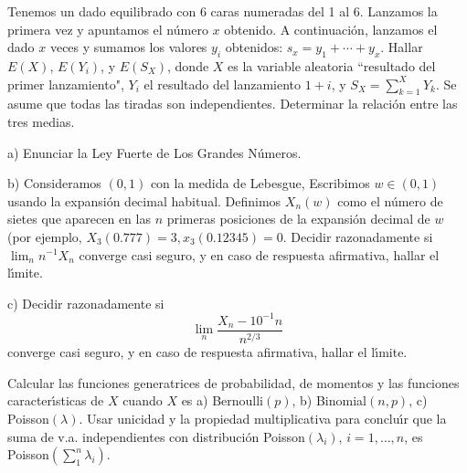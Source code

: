 \begin{problem}[2] Tenemos un dado equilibrado con 6 caras numeradas del 1 al 6. Lanzamos la  primera vez y 
apuntamos el n\'umero $x$ obtenido. A continuaci\'on, 
lanzamos el dado $x$ veces y sumamos los valores $y_i$ obtenidos: $s_x = y_1 + \cdots  + y_x$.
Hallar $E(X)$, $E(Y_i)$, y $E(S_X)$, donde $X$ es la variable aleatoria ``resultado del primer lanzamiento", $Y_i$ el resultado del lanzamiento
$ 1 + i$, y $S_X = \sum_{k = 1}^X Y_k$. Se asume que todas
las tiradas son independientes. 
Determinar la relaci\'on entre las tres medias.
\solution

\begin{expla}

\end{expla}

\end{problem}


\begin{problem}[3] a) Enunciar la Ley Fuerte de Los Grandes N\'umeros.

b) Consideramos $(0,1)$ con la medida de Lebesgue, Escribimos $w\in (0,1)$ usando
la expansi\'on decimal habitual. Definimos $X_n(w)$ como el n\'umero de sietes que aparecen
en las $n$ primeras posiciones de la expansi\'on decimal de $w$ (por ejemplo, $X_3(0.777) = 3,
 x_3(0.12345) = 0$.  Decidir razonadamente si $\lim_n n^{-1}X_n$ converge casi seguro, y
 en caso de respuesta afirmativa, hallar el l\'{\i}mite.
 
 c) Decidir razonadamente si 
 $$
 \lim_n \frac{X_n - 10^{-1}n}{n^{2/3}}
 $$ 
 converge casi seguro, y
 en caso de respuesta afirmativa, hallar el l\'{\i}mite.
\solution

\begin{expla}

\end{expla}

\end{problem}


\begin{problem}[4]  Calcular las funciones generatrices de probabilidad, de momentos y las funciones caracter\'{\i}sticas de $X$ cuando $X$ es
a) Bernoulli$(p)$,
b) Binomial$(n,p)$,
c) Poisson$(\lambda)$. Usar unicidad y la propiedad multiplicativa para conclu\'{\i}r que la suma de v.a. independientes
con distribuci\'on Poisson$(\lambda_i)$, $i = 1, \dots, n$, es Poisson$(\sum_1^n \lambda_i)$.
\solution

\begin{expla}

\end{expla}

\end{problem}

